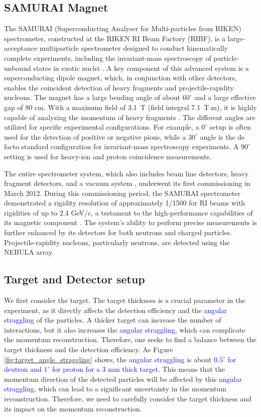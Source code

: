 \documentclass[twocolumn,twoside,showpacs,showkeys,preprintnumbers,superscriptaddress,amsmath,amssymb,prc,nofootinbib,a4paper]{revtex4}
\begin{document}
\subsection{SAMURAI Magnet}
The SAMURAI (Superconducting Analyser for Multi-particles from RIKEN) spectrometer, constructed at the RIKEN RI Beam Factory (RIBF), is a large-acceptance multiparticle spectrometer designed to conduct kinematically complete experiments, including the invariant-mass spectroscopy of particle-unbound states in exotic nuclei \cite{Kobayashi2013}. A key component of this advanced system is a superconducting dipole magnet, which, in conjunction with other detectors, enables the coincident detection of heavy fragments and projectile-rapidity nucleons. The magnet has a large bending angle of about $60^\circ$ and a large effective gap of 80 cm. With a maximum field of 3.1~T (field integral 7.1~T$\cdot$m), it is highly capable of analyzing the momentum of heavy fragments \cite{Kobayashi2013}. The different angles are utilized for specific experimental configurations. For example, a $0^\circ$ setup is often used for the detection of positive or negative pions, while a $30^\circ$ angle is the de facto standard configuration for invariant-mass spectroscopy experiments. A $90^\circ$ setting is used for heavy-ion and proton coincidence measurements.

The entire spectrometer system, which also includes beam line detectors, heavy fragment detectors, and a vacuum system \cite{SHIMIZU2013739}, underwent its first commissioning in March 2012. During this commissioning period, the SAMURAI spectrometer demonstrated a rigidity resolution of approximately 1/1500 for RI beams with rigidities of up to 2.4 GeV/c, a testament to the high-performance capabilities of its magnetic component \cite{Kobayashi2013}. The system's ability to perform precise measurements is further enhanced by its detectors for both neutrons and charged particles. Projectile-rapidity nucleons, particularly neutrons, are detected using the NEBULA array.

\subsection{Target and Detector setup}


We first consider the target. The target thickness is a crucial parameter in the experiment, as it directly affects the detection efficiency and the \textcolor{blue}{angular straggling} of the particles. A thicker target can increase the number of interactions, but it also increases the \textcolor{blue}{angular straggling}, which can complicate the momentum reconstruction. Therefore, one seeks to find a balance between the target thickness and the detection efficiency.
 As  Figure \ref{fig:target_angle_straggling} shows, the \textcolor{blue}{angular straggling} is about \textcolor{blue}{$0.5^\circ$ for deutron and $1^\circ$ for proton for a 3 mm thick target}. This means that the momentum direction of the detected particles will be affected by this \textcolor{blue}{angular straggling}, which can lead to a significant uncertainty in the momentum reconstruction. Therefore, we need to carefully consider the target thickness and its impact on the momentum reconstruction. 
\end{document}
